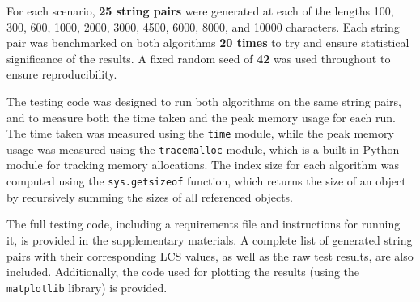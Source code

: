 For each scenario, \textbf{25 string pairs} were generated at each of the lengths 100, 300, 600, 1000, 2000, 3000, 4500, 6000, 8000, and 10000 characters.
Each string pair was benchmarked on both algorithms \textbf{20 times} to try and ensure statistical significance of the results.
A fixed random seed of \textbf{42} was used throughout to ensure reproducibility.

The testing code was designed to run both algorithms on the same string pairs, and to measure both the time taken and the peak memory usage for each run.
The time taken was measured using the \texttt{time} module, while the peak memory usage was measured using the \texttt{tracemalloc} module, which is a built-in Python module for tracking memory allocations.
The index size for each algorithm was computed using the \texttt{sys.getsizeof} function, which returns the size of an object by recursively summing the sizes of all referenced objects.

The full testing code, including a requirements file and instructions for running it, is provided in the supplementary materials. 
A complete list of generated string pairs with their corresponding LCS values, as well as the raw test results, are also included. 
Additionally, the code used for plotting the results (using the \texttt{matplotlib} library) is provided.